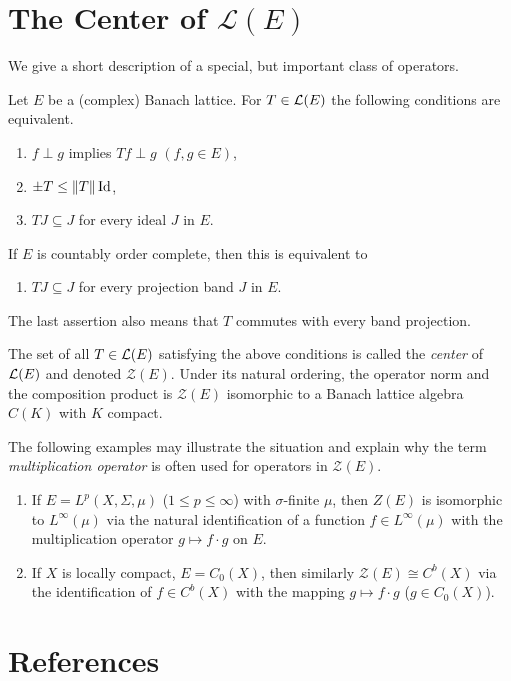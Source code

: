 \section{The Center of 
\texorpdfstring{$\mathcal{L}(E)$}{L(E)}}\label{sec:c1-9}
%
We give a short description of a special, but important class of operators.
\begin{proposition*}
Let $ E $ be a (complex) Banach lattice.
For $ T \in \mathcal{L}(E) $ the following conditions are equivalent.
\begin{enumerate}[\upshape (a)]

    \item 
    $ f \perp g $ implies $ Tf \perp g $ \quad $(f, g \in E)$,
    
    \item 
    $ \pm T \leq \|T\| \Id $,
    
    \item 
    $ TJ \subseteq J $ for every ideal $ J $ in $ E $.
    
\end{enumerate}
If\/ $ E $ is countably order complete, then this is equivalent to
\begin{enumerate}
    \item 
    $ TJ \subseteq J $ for every projection band $ J $ in $ E $.
\end{enumerate}
The last assertion also means that $ T $ commutes with every band projection.
\end{proposition*}
The set of all $ T \in \mathcal{L}(E) $ satisfying the above conditions is called the \emph{center} of\/ $ \mathcal{L}(E) $ and denoted 
$ \mathcal{Z}(E) $.
Under its natural ordering, the operator norm and the composition product is $ \mathcal{Z}(E) $ isomorphic to a Banach lattice algebra $ C(K) $ with $ K $ compact.

The following examples may illustrate the situation and explain why the term \emph{multiplication operator} is often used for operators in $ \mathcal{Z}(E) $.
\begin{enumerate}[\upshape (i), wide, labelindent=.25em]
\item 
If\/ $ E = L^{p}(X,\Sigma,\mu) $ ($ 1 \leq p \leq \infty $) with $ \sigma $-finite $ \mu $, then $ Z(E) $ is isomorphic to $ L^{\infty}(\mu) $ via the natural identification of a function $ f \in L^{\infty}(\mu) $ with the multiplication operator $ g \mapsto f\cdot g $ on $ E $. 

\item 
If\/ $ X $ is locally compact, $ E = C_{0}(X) $, then similarly $ \mathcal{Z}(E) \cong C^{b}(X) $ via the identification of\/ $ f \in C^{b}(X) $ with the mapping $ g \mapsto f\cdot g $ ($ g \in C_{0}(X) $).
\end{enumerate}
\section*{References}
{\RaggedRight
  \printbibliography[heading=none]
 }